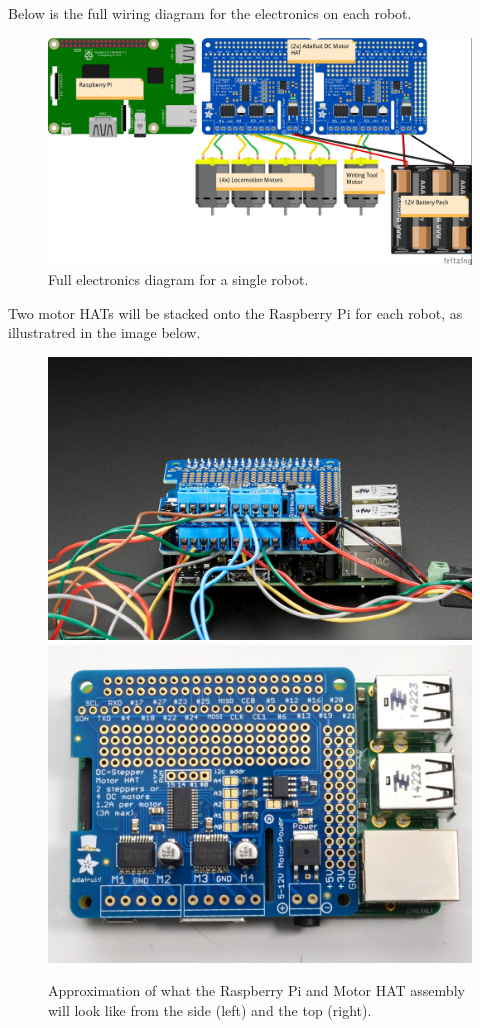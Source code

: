 Below is the full wiring diagram for the electronics on each robot. 

\begin{figure}
\centering
\includegraphics[width=0.9\columnwidth]{figs/wiring-diagram.jpg}
\caption{Full electronics diagram for a single robot.}
\label{fig:electronics-diagram}
\end{figure}

Two motor HATs will be stacked onto the Raspberry Pi for each robot, as illustratred in the image below.

\begin{figure}
\centering
\includegraphics[width=0.45\columnwidth]{figs/HATs-on-pi.jpg}
\includegraphics[width=0.45\columnwidth]{figs/HAT-on-pi.jpg}
\caption{Approximation of what the Raspberry Pi and Motor HAT assembly will look like from the side (left) and the top (right).}
\label{fig:HATs}
\end{figure}